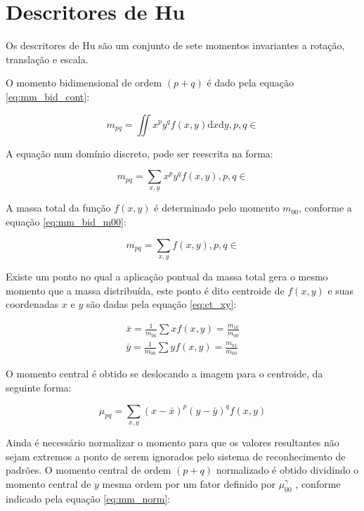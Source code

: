 \section{Descritores de Hu}\label{sec:desc_hu}

Os descritores de Hu são um conjunto de sete momentos invariantes a rotação,
translação e escala.

O momento bidimensional de ordem $ (p+q) $ é dado pela
equação \ref{eq:mm_bid_cont}:

\begin{equation}\label{eq:mm_bid_cont}
m_{pq} = \iint x^p y^q f(x, y) \mathrm{d}x \mathrm{d}y, p, q \in
\end{equation}

A equação num domínio discreto, pode ser reescrita na forma:

\begin{equation}\label{eq:mm_bid_disc}
m_{pq} = \sum_{x, y} x^p y^q f(x, y), p, q \in
\end{equation}

A massa total da função $ f(x, y) $ é determinado pelo
momento $ m_{00} $, conforme a equação \ref{eq:mm_bid_m00}:

\begin{equation}\label{eq:mm_bid_m00}
m_{pq} = \sum_{x, y} f(x, y), p, q \in
\end{equation}

Existe um ponto no qual a aplicação pontual da massa total gera o mesmo momento
que a massa distribuída, este ponto é dito centroide de $ f(x, y) $ e suas
coordenadas $ x $ e $ y $ são dadas pela equação \ref{eq:ct_xy}:

\begin{subequations}\label{eq:ct_xy}
\begin{align}
    \bar{x} = \frac{1}{ m_{00} } \sum x f(x, y) = \frac{ m_{10} }{ m_{00} } \\
    \bar{y} = \frac{1}{ m_{00} } \sum y f(x, y) = \frac{ m_{01} }{ m_{00} }
\end{align}
\end{subequations}

O momento central é obtido se deslocando a imagem para o centroide,
da seguinte forma:

\begin{equation}\label{eq:mm_ctr}
\mu_{pq} = \sum_{x, y} (x - \bar{x})^p (y - \bar{y})^q f(x, y)
\end{equation}

Ainda é necessário normalizar o momento para que os valores resultantes não sejam
extremos a ponto de serem ignorados pelo sistema de reconhecimento de padrões. O
momento central de ordem $ (p+q) $ normalizado é obtido dividindo o momento
central de $ y $ mesma ordem por um fator definido por $ \mu_{00}^\gamma $ ,
conforme indicado pela equação \ref{eq:mm_norm}:

